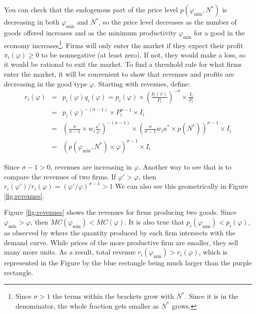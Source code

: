 \documentclass[11pt,letterpaper]{article}
\begin{document}
You can check that the endogenous part of the price level $p(\varphi_{\min},N^*)$ is decreasing in both $\varphi_{\min}$ and $N^*$, so the price level decreases as the number of goods offered increases and as the minimum productivity $\varphi_{\min}$ for a good in the economy increases\footnote{Since $\sigma>1$ the terms within the brackets grow with $N^*$. Since it is in the denominator, the whole fraction gets smaller as $N^*$ grows.}. Firms will only enter the market if they expect their profit $\pi_i(\varphi) \ge0$ to be nonnegative (at least zero). If not, they would make a loss, so it would be rational to exit the market. To find a threshold rule for what firms enter the market, it will be convenient to show that revenues and profits are decreasing in the good type $\varphi$. Starting with revenues, define:
\begin{eqnarray*}
    r_i(\varphi) &=& p_i(\varphi)q_i(\varphi) = p_i(\varphi)\times \left( \frac{p_i(\varphi)}{P_i} \right)^{-\sigma} \times \frac{I_i}{P_i}  \\
    &=&  p_i(\varphi)^{-(\sigma-1)} \times P_i^{\sigma-1}\times I_i \\
    &=&  \left( \frac{\sigma}{\sigma-1} \times  w_i\frac{a^*}{\varphi}  \right)^{-(\sigma-1)} \times \left(  \frac{\sigma}{\sigma-1} w_i a^* \times p(N^*) \right)^{\sigma-1}\times I_i \\
    &=&  \left(p(\varphi_{\min},N^*) \times \varphi \right)^{\sigma-1} \times I_i
\end{eqnarray*}

Since $\sigma-1>0$, revenues are increasing in $\varphi$. Another way to see that is to compare the revenues of two firms. If $\varphi'>\varphi$, then $r_i(\varphi')/r_i(\varphi) = (\varphi' / \varphi)^{\sigma-1} > 1 $ We can also see this geometrically in Figure \ref{fig:revenues}.

Figure \ref{fig:revenues} shows the revenues for firms producing two goods. Since $\varphi_{\min} > \varphi$, then $MC(\varphi_{\min}) < MC(\varphi)$. It is also true that $p_i(\varphi_{\min}) <p_i(\varphi)$, as observed by where the quantity produced by each firm intersects with the demand curve. While prices of the more productive firm are smaller, they sell many more units. As a result, total revenue $r_i(\varphi_{\min})>r_i(\varphi)$, which is represented in the Figure by the blue rectangle being much larger than the purple rectangle. 
\end{document}
